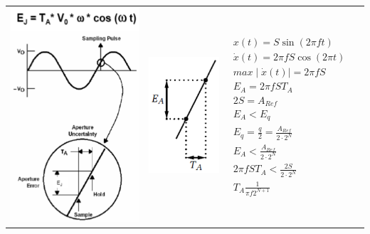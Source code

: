 \begin{longtable}[c]{ l  l l l }
\begin{minipage}{4cm}

  \includegraphics[scale=0.45]{pictures/aperturfehlercos}

\end{minipage}
&
\begin{minipage}{3cm}

  \includegraphics[scale=0.5]{pictures/aperturfehler}
\end{minipage}
&
\begin{minipage}{5cm}
\begin{gather*}
x(t)=S\sin(2\pi ft)\\
\dot{x}(t)=2\pi fS\cos(2\pi t)\\
max\mid\dot{x}(t)\mid= 2\pi fS \\
E_{A}=2\pi fST_{A}\\
2S=A_{Ref}\\
E_{A}<E_{q}\\
E_{q}=\frac{q}{2}=\frac{A_{Ref}}{2\cdot2^N}\\
E_{A}<\frac{A_{Ref}}{2\cdot2^N}\\
2\pi fST_{A} <\frac{2S}{2\cdot2^N}\\
T_{A}\frac{1}{\pi f2^{N+1}}
\end{gather*}




\end{minipage}
\end{longtable}
